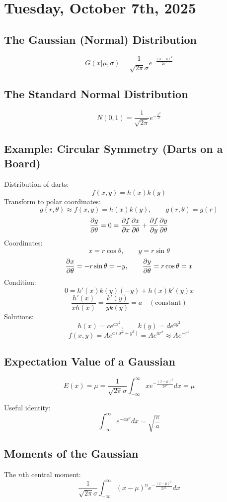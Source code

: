 \section{Tuesday, October 7th, 2025}

\subsection{The Gaussian (Normal) Distribution}
\[
      G(x|\mu, \sigma) = \frac{1}{\sqrt{2 \pi} \sigma}
      e^{-\frac{(x - \mu)^2}{2 \sigma^2}}
\]

\subsection{The Standard Normal Distribution}
\[
      N(0,1) = \frac{1}{\sqrt{2 \pi}} e^{-\frac{x^2}{2}}
\]

\subsection{Example: Circular Symmetry (Darts on a Board)}
Distribution of darts:
\[
      f(x,y) = h(x) k(y)
\]
Transform to polar coordinates:
\[
      g(r,\theta) \approx f(x,y) = h(x)k(y), \qquad g(r,\theta) = g(r)
\]
\[
      \pdv{g}{\theta} = 0
      = \pdv{f}{x}\pdv{x}{\theta} + \pdv{f}{y}\pdv{y}{\theta}
\]
Coordinates:
\[
      x = r \cos\theta, \qquad y = r \sin\theta
\]
\[
      \pdv{x}{\theta} = -r \sin\theta = -y, \qquad
      \pdv{y}{\theta} = r \cos\theta = x
\]
Condition:
\[
      0 = h'(x) k(y)(-y) + h(x) k'(y) x
\]
\[
      \frac{h'(x)}{x h(x)} = \frac{k'(y)}{y k(y)} = a \quad (\text{constant})
\]
Solutions:
\[
      h(x) = c e^{a x^2}, \qquad k(y) = d e^{a y^2}
\]
\[
      f(x,y) = A e^{a(x^2+y^2)} = A e^{a r^2} \approx A e^{-r^2}
\]

\subsection{Expectation Value of a Gaussian}
\[
      E(x) = \mu = \frac{1}{\sqrt{2 \pi}\sigma}
      \int_{-\infty}^{\infty} x e^{-\frac{(x - \mu)^2}{2\sigma^2}} dx = \mu
\]

Useful identity:
\[
      \int_{-\infty}^{\infty} e^{-a x^2} dx = \sqrt{\frac{\pi}{a}}
\]

\subsection{Moments of the Gaussian}
The $n$th central moment:
\[
      \frac{1}{\sqrt{2 \pi}\sigma} \int_{-\infty}^{\infty} (x-\mu)^n
      e^{-\frac{(x-\mu)^2}{2\sigma^2}} dx
\]


